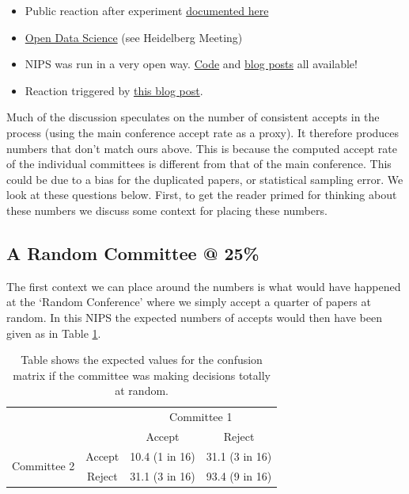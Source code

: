 \begin{itemize}
\item
  Public reaction after experiment
  \href{http://inverseprobability.com/2015/01/16/blogs-on-the-nips-experiment/}{documented
  here}
\item
  \href{http://inverseprobability.com/2014/07/01/open-data-science/}{Open
  Data Science} (see Heidelberg Meeting)
\item
  NIPS was run in a very open way.
  \href{https://github.com/sods/conference}{Code} and
  \href{http://inverseprobability.com/2014/12/16/the-nips-experiment/}{blog
  posts} all available!
\item
  Reaction triggered by
  \href{http://blog.mrtz.org/2014/12/15/the-nips-experiment.html}{this
  blog post}.
\end{itemize}

Much of the discussion speculates on the number of consistent accepts in
the process (using the main conference accept rate as a proxy). It
therefore produces numbers that don't match ours above. This is because
the computed accept rate of the individual committees is different from
that of the main conference. This could be due to a bias for the
duplicated papers, or statistical sampling error. We look at these
questions below. First, to get the reader primed for thinking about
these numbers we discuss some context for placing these numbers.

\hypertarget{a-random-committee-25}{%
\subsection{A Random Committee @ 25\%}\label{a-random-committee-25}}

\begin{flushright}
\end{flushright}

The first context we can place around the numbers is what would have
happened at the `Random Conference' where we simply accept a quarter of
papers at random. In this NIPS the expected numbers of accepts would
then have been given as in Table \ref{table-random-committee}.

\begin{table}[htb]
\caption{Table shows the expected values for the confusion matrix if the committee was making decisions totally at random.}
\label{table-random-committee}



  \begin{tabular}{lc|c|c|}
  & & \multicolumn{2}{c}{Committee 1} \\
  & & Accept & Reject \\
  \multirow{2}{*}{Committee 2} & Accept & 10.4 (1 in 16) & 31.1 (3 in 16) \hline \\
  & Reject & 31.1 (3 in 16) & 93.4 (9 in 16) 
  \end{tabular}
\end{table}

